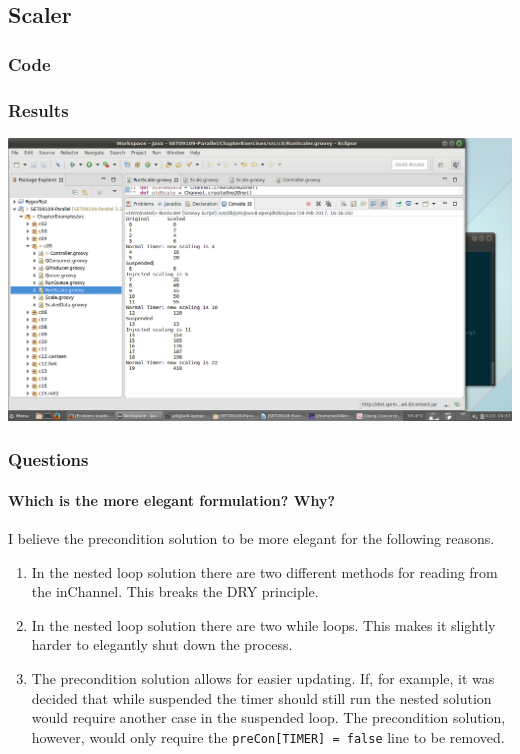 \subsection{Scaler}

\subsubsection*{Code}



\subsubsection*{Results}

\includegraphics[width=\textwidth]{img/screenshots/5-2.png}

\subsubsection*{Questions}

\paragraph{Which is the more elegant formulation? Why?}

I believe the precondition solution to be more elegant for the following reasons.

\begin{enumerate}
	\item In the nested loop solution there are two different methods for reading from the inChannel.  This breaks the DRY principle.

	\item In the nested loop solution there are two while loops.  This makes it slightly harder to elegantly shut down the process.

	\item The precondition solution allows for easier updating.  If, for example, it was decided that while suspended the timer should still run the nested solution would require another case in the suspended loop.  The precondition solution, however, would only require the \texttt{preCon[TIMER] = false} line to be removed.

\end{enumerate}
